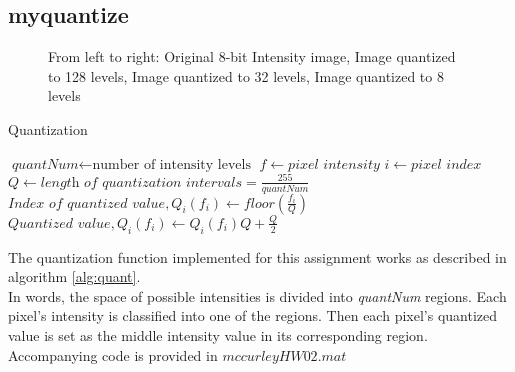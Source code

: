 \documentclass{article}[12 pt]
\begin{document}
\newpage
\subsection*{myquantize}
\begin{figure}[h!]
\captionsetup[subfloat]{labelformat=empty}
\centering
{}
\hspace{0mm}
\hspace{0mm}
\caption{From left to right: Original 8-bit Intensity image, Image quantized to 128 levels, Image quantized to 32 levels, Image quantized to 8 levels}
\end{figure}




\begin{algorithm}[H]
\caption{Quantization}\label{alg:quant}
\begin{algorithmic}[1]
\State $\textit{quantNum} \gets \text{number of intensity levels}$
\State $f \gets \textit{pixel intensity}$
\State $i \gets \textit{pixel index}$
\State $\textit{Q} \gets \textit{length of quantization intervals} = \frac{255}{quantNum}$
\State $\textit{Index of quantized value}, Q_i(f_i) \gets \textit{floor}(\frac{f_i}{Q})$
\State $\textit{Quantized value}, Q_i(f_i) \gets Q_i(f_i)Q+\frac{Q}{2}$
\EndFor
\EndProcedure
{}
\end{algorithmic}
\end{algorithm}
\vspace{5mm}
\noindent
The quantization function implemented for this assignment works as described in algorithm \ref{alg:quant}. \\
\noindent
In words, the space of possible intensities is divided into \textit{quantNum} regions.  Each pixel's intensity is classified into one of the regions.  Then each pixel's quantized value is set as the middle intensity value in its corresponding region.\\
 
 \noindent 
 Accompanying code is provided in $mccurleyHW02.mat$
\end{document}
